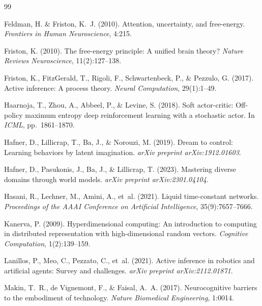\documentclass[11pt,a4paper]{article}
\begin{document}
\begin{thebibliography}{99}

Feldman, H. \& Friston, K.~J. (2010).
\newblock Attention, uncertainty, and free-energy.
\newblock \emph{Frontiers in Human Neuroscience}, 4:215.

Friston, K. (2010).
\newblock The free-energy principle: A unified brain theory?
\newblock \emph{Nature Reviews Neuroscience}, 11(2):127--138.

Friston, K., FitzGerald, T., Rigoli, F., Schwartenbeck, P., \& Pezzulo, G. (2017).
\newblock Active inference: A process theory.
\newblock \emph{Neural Computation}, 29(1):1--49.

Haarnoja, T., Zhou, A., Abbeel, P., \& Levine, S. (2018).
\newblock Soft actor-critic: Off-policy maximum entropy deep reinforcement learning with a stochastic actor.
\newblock In \emph{ICML}, pp.\ 1861--1870.

Hafner, D., Lillicrap, T., Ba, J., \& Norouzi, M. (2019).
\newblock Dream to control: Learning behaviors by latent imagination.
\newblock \emph{arXiv preprint arXiv:1912.01603}.

Hafner, D., Pasukonis, J., Ba, J., \& Lillicrap, T. (2023).
\newblock Mastering diverse domains through world models.
\newblock \emph{arXiv preprint arXiv:2301.04104}.

Hasani, R., Lechner, M., Amini, A., et~al. (2021).
\newblock Liquid time-constant networks.
\newblock \emph{Proceedings of the AAAI Conference on Artificial Intelligence}, 35(9):7657--7666.

Kanerva, P. (2009).
\newblock Hyperdimensional computing: An introduction to computing in distributed representation with high-dimensional random vectors.
\newblock \emph{Cognitive Computation}, 1(2):139--159.

Lanillos, P., Meo, C., Pezzato, C., et~al. (2021).
\newblock Active inference in robotics and artificial agents: Survey and challenges.
\newblock \emph{arXiv preprint arXiv:2112.01871}.

Makin, T.~R., de Vignemont, F., \& Faisal, A.~A. (2017).
\newblock Neurocognitive barriers to the embodiment of technology.
\newblock \emph{Nature Biomedical Engineering}, 1:0014.


\end{thebibliography}
\end{document}
